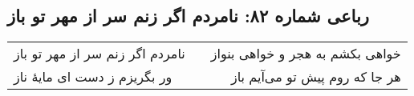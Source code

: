 \begin{center}
\section*{رباعی شماره ۸۲: نامردم اگر زنم سر از مهر تو باز}
\label{sec:082}
\begin{longtable}{l p{0.5cm} r}
نامردم اگر زنم سر از مهر تو باز
&&
خواهی بکشم به هجر و خواهی بنواز
\\
ور بگریزم ز دست ای مایهٔ ناز
&&
هر جا که روم پیش تو می‌آیم باز
\\
\end{longtable}
\end{center}
